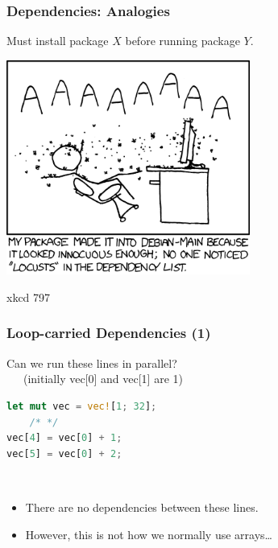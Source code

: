\begin{frame}
\frametitle{Dependencies: Analogies}

Must install package $X$ before running package $Y$.

\begin{center}
	\includegraphics[width=0.6\textwidth]{images/debian_main.png}
\end{center}
\hfill xkcd 797
	

\end{frame}


\begin{frame}[fragile]
\frametitle{Loop-carried Dependencies (1)}

Can we run these lines in parallel? \\ ~~~(initially vec[0] and vec[1] are 1)
\begin{lstlisting}[language=Rust]
let mut vec = vec![1; 32];
    /* */
vec[4] = vec[0] + 1;
vec[5] = vec[0] + 2;
\end{lstlisting}
\pause
{}\\[1em]
\begin{itemize}
\item There are no dependencies between these lines.
\item However, this is not how we normally use arrays\ldots
\end{itemize}

\end{frame}


